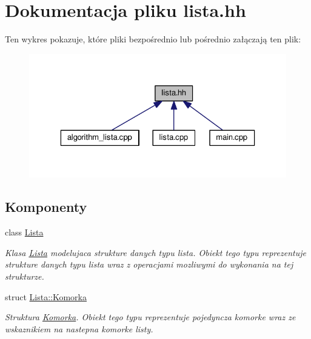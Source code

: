 \hypertarget{lista_8hh}{\section{Dokumentacja pliku lista.\-hh}
\label{lista_8hh}
}
Ten wykres pokazuje, które pliki bezpośrednio lub pośrednio załączają ten plik\-:\nopagebreak
\begin{figure}[H]
\begin{center}
\leavevmode
\includegraphics[width=323pt]{lista_8hh__dep__incl}
\end{center}
\end{figure}
\subsection*{Komponenty}
\begin{DoxyCompactItemize}
\item 
class \hyperlink{class_lista}{Lista}
\begin{DoxyCompactList}\small\item\em Klasa \hyperlink{class_lista}{Lista} modelujaca strukture danych typu lista. Obiekt tego typu reprezentuje strukture danych typu lista wraz z operacjami mozliwymi do wykonania na tej strukturze. \end{DoxyCompactList}\item 
struct \hyperlink{struct_lista_1_1_komorka}{Lista\-::\-Komorka}
\begin{DoxyCompactList}\small\item\em Struktura \hyperlink{struct_lista_1_1_komorka}{Komorka}. Obiekt tego typu reprezentuje pojedyncza komorke wraz ze wskaznikiem na nastepna komorke listy. \end{DoxyCompactList}\end{DoxyCompactItemize}
